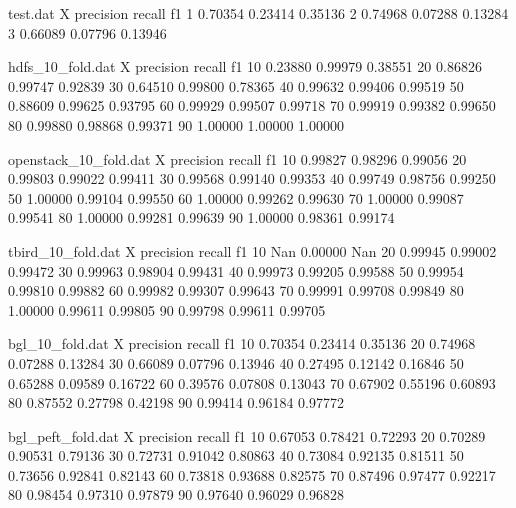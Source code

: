 \begin{filecontents}{test.dat}
X precision recall f1
1 0.70354 0.23414 0.35136
2 0.74968 0.07288 0.13284
3 0.66089 0.07796 0.13946
\end{filecontents}

\begin{filecontents}{hdfs_10_fold.dat}
X precision recall f1
10 0.23880	0.99979	0.38551
20 0.86826	0.99747	0.92839
30 0.64510	0.99800	0.78365
40 0.99632	0.99406	0.99519
50 0.88609	0.99625	0.93795
60 0.99929	0.99507	0.99718
70 0.99919	0.99382	0.99650
80 0.99880	0.98868	0.99371
90 1.00000	1.00000	1.00000
\end{filecontents}

\begin{filecontents}{openstack_10_fold.dat}
X precision recall f1
10 0.99827	0.98296	0.99056
20 0.99803	0.99022	0.99411
30 0.99568	0.99140	0.99353
40 0.99749	0.98756	0.99250
50 1.00000	0.99104	0.99550
60 1.00000	0.99262	0.99630
70 1.00000	0.99087	0.99541
80 1.00000	0.99281	0.99639
90 1.00000	0.98361	0.99174
\end{filecontents}

\begin{filecontents}{tbird_10_fold.dat}
X precision recall f1
10 Nan	0.00000	Nan
20 0.99945	0.99002	0.99472
30 0.99963	0.98904	0.99431
40 0.99973	0.99205	0.99588
50 0.99954	0.99810	0.99882
60 0.99982	0.99307	0.99643
70 0.99991	0.99708	0.99849
80 1.00000	0.99611	0.99805
90 0.99798	0.99611	0.99705
\end{filecontents}

\begin{filecontents}{bgl_10_fold.dat}
X precision recall f1
10 0.70354 0.23414 0.35136
20 0.74968 0.07288 0.13284
30 0.66089 0.07796 0.13946
40 0.27495 0.12142 0.16846
50 0.65288 0.09589 0.16722
60 0.39576 0.07808 0.13043
70 0.67902 0.55196 0.60893
80 0.87552 0.27798 0.42198
90 0.99414 0.96184 0.97772
\end{filecontents}

\begin{filecontents}{bgl_peft_fold.dat}
X precision recall f1
10 0.67053 0.78421 0.72293
20 0.70289 0.90531 0.79136
30 0.72731 0.91042 0.80863
40 0.73084 0.92135 0.81511
50 0.73656 0.92841 0.82143
60 0.73818 0.93688 0.82575
70 0.87496 0.97477 0.92217
80 0.98454 0.97310 0.97879
90 0.97640 0.96029 0.96828
\end{filecontents}









